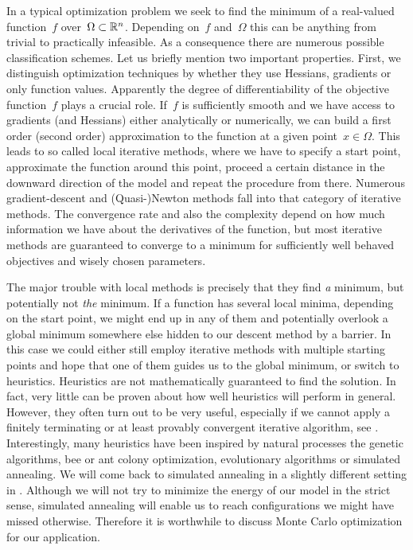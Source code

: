In a typical optimization problem we seek to find the minimum of a real-valued
function~$f$ over~$\Omega \subset \mathbb{R}^n$. Depending on~$f$ and~$\Omega$ this can
be anything from trivial to practically infeasible. As a consequence there are
numerous possible classification schemes. Let us briefly mention two important
properties. First, we distinguish optimization techniques by whether they use
Hessians, gradients or only function values. Apparently the degree of
differentiability of the objective function~$f$ plays a crucial role.  If~$f$ is
sufficiently smooth and we have access to gradients (and Hessians) either
analytically or numerically, we can build a first order (second order)
approximation to the function at a given point~$x \in \Omega$. This leads to so
called local iterative methods, where we have to specify a start point,
approximate the function around this point, proceed a certain distance in the
downward direction of the model and repeat the procedure from there. Numerous
gradient-descent and (Quasi-)Newton methods fall into that category of iterative
methods. The convergence rate and also the complexity depend on how much
information we have about the derivatives of the function, but most iterative
methods are guaranteed to converge to a minimum for sufficiently well behaved
objectives and wisely chosen parameters.

The major trouble with local methods is precisely that they find \emph{a}
minimum, but potentially not \emph{the} minimum. If a function has several local
minima, depending on the start point, we might end up in any of them and
potentially overlook a global minimum somewhere else hidden to our descent
method by a barrier. In this case we could either still employ iterative methods
with multiple starting points and hope that one of them guides us to the global
minimum, or switch to heuristics. Heuristics are not mathematically guaranteed
to find the solution. In fact, very little can be proven about how well
heuristics will perform in general. However, they often turn out to be very
useful, especially if we cannot apply a finitely terminating or at least
provably convergent iterative algorithm, see .
Interestingly, many heuristics have been inspired by natural processes the
genetic algorithms, bee or ant colony optimization, evolutionary algorithms or
simulated annealing. We will come back to simulated annealing in a slightly
different setting in . Although we will not try to minimize
the energy of our model in the strict sense, simulated annealing will enable us
to reach configurations we might have missed otherwise. Therefore it is
worthwhile to discuss Monte Carlo optimization for our application.

